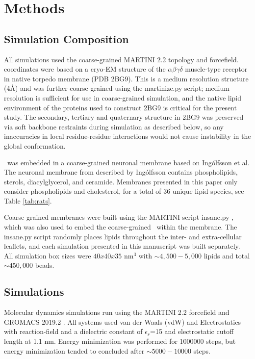 \section{Methods}
\label{lab}

\subsection{Simulation Composition}
All simulations used the coarse-grained MARTINI 2.2\cite{DeJong2012} topology and forcefield.
\nachr~ coordinates were based on a cryo-EM structure of the $\alpha{\beta}\gamma\delta$ muscle-type receptor in native torpedo membrane (PDB 2BG9\cite{Unwin2005}). This is a medium resolution structure (4\AA) and was further coarse-grained using the martinize.py script; medium resolution is sufficient for use in coarse-grained simulation, and the native lipid environment of the proteins used to construct 2BG9 is critical for the present study. The secondary, tertiary and quaternary structure in 2BG9 was preserved via soft backbone restraints during simulation as described below, so any inaccuracies in local residue-residue interactions would not cause instability in the global conformation.  

\nachr~was embedded in a coarse-grained neuronal membrane based on Ing{\'o}lfsson et al\cite{Ingolfsson2017b}. The neuronal membrane from described by Ing{\'o}lfsson contains phospholipids, sterols, diacylglycerol, and ceramide. Membranes presented in this paper only consider phospholipids and cholesterol, for a total of 36 unique lipid species, see Table \ref{tab:rats}.

Coarse-grained membranes were built using the MARTINI script insane.py \cite{Wassenaar2015}, which was also used to embed the coarse-grained \nachr~within the membrane. The insane.py script randomly places lipids throughout the inter- and extra-cellular leaflets, and each simulation presented in this manuscript was built separately. All simulation box sizes were $40x40x35$ nm$^3$ with  $\sim 4,500-5,000$ lipids and total $\sim450,000$ beads.

\subsection{Simulations}

Molecular dynamics simulations run using the MARTINI 2.2\cite{DeJong2012} forcefield and GROMACS\cite{Berendsen1995,Abraham2015}  2019.2 . All systems used van der Waals (vdW) and Electrostatics with reaction-field and a dielectric constant of $\epsilon_r$=15 and electrostatic cutoff length at 1.1 nm. Energy minimization was performed for 1000000 steps, but energy minimization tended to concluded after $\sim 5000-10000$ steps.

